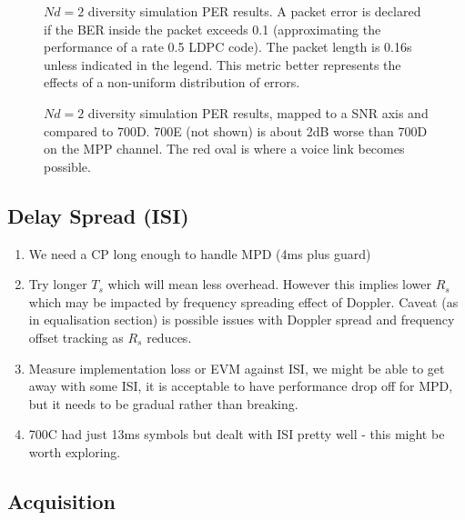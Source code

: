 \documentclass{article}
\begin{document}
\begin{figure}[H]
\caption{$Nd=2$ diversity simulation PER results. A packet error is declared if the BER inside the packet exceeds 0.1 (approximating the performance of a rate 0.5 LDPC code). The packet length is 0.16s unless indicated in the legend. This metric better represents the effects of a non-uniform distribution of errors.}
\label{fig:div_per_curves}
\begin{center}

\end{center}
\end{figure}

\begin{figure}[H]
\caption{$Nd=2$ diversity simulation PER results, mapped to a SNR axis and compared to 700D. 700E (not shown) is about 2dB worse than 700D on the MPP channel. The red oval is where a voice link becomes possible.}
\label{fig:snr_per_curves}
\begin{center}

\end{center}
\end{figure}

\subsection{Delay Spread (ISI)}

\begin{enumerate}
\item We need a CP long enough to handle MPD (4ms plus guard)
\item Try longer $T_s$ which will mean less overhead. However this implies lower $R_s$ which may be impacted by frequency spreading effect of Doppler.  Caveat (as in equalisation section) is possible issues with Doppler spread and frequency offset tracking as $R_s$ reduces.
\item Measure implementation loss or EVM against ISI, we might be able to get away with some ISI, it is acceptable to have performance drop off for MPD, but it needs to be gradual rather than breaking.
\item 700C had just 13ms symbols but dealt with ISI pretty well - this might be worth exploring.
\end{enumerate}

\subsection{Acquisition}
\end{document}
